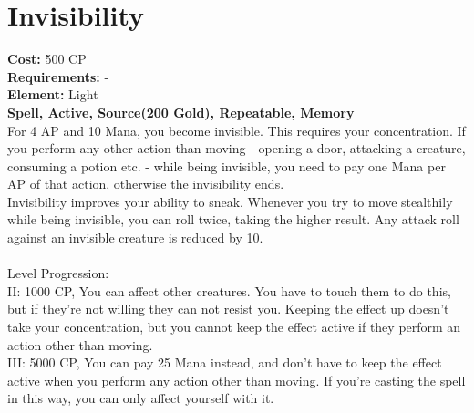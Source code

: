 \section{Invisibility}
\textbf{Cost:} 500 CP\\
\textbf{Requirements:} -\\
\textbf{Element:} Light\\
\textbf{Spell, Active, Source(200 Gold), Repeatable, Memory}\\
For 4 AP and 10 Mana, you become invisible. This requires your concentration. If you perform any other action than moving - opening a door, attacking a creature, consuming a potion etc. - while being invisible, you need to pay one Mana per AP of that action, otherwise the invisibility ends.\\
Invisibility improves your ability to sneak. Whenever you try to move stealthily while being invisible, you can roll twice, taking the higher result. Any attack roll against an invisible creature is reduced by 10.\\
\\
Level Progression:\\
II: 1000 CP, You can affect other creatures. You have to touch them to do this, but if they're not willing they can not resist you. Keeping the effect up doesn't take your concentration, but you cannot keep the effect active if they perform an action other than moving.\\
III: 5000 CP, You can pay 25 Mana instead, and don't have to keep the effect active when you perform any action other than moving. If you're casting the spell in this way, you can only affect yourself with it.\\